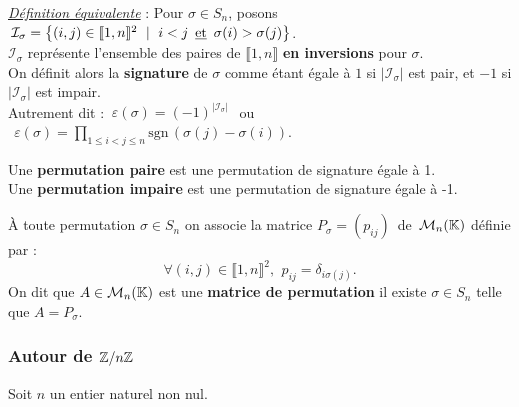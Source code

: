 \underline{\emph{Définition équivalente}} : Pour $\sigma\in S_n$, posons \(\,\mathcal{I}_\sigma = \bigl\{(i,j)\in \llbracket 1,n\rrbracket^2 \ \mid \ i<j \,\text{ \underline{et} }\, \sigma(i) > \sigma(j)\bigr\}\).\vspace{0.1cm}\\
\(\mathcal{I}_\sigma\) représente l'ensemble des paires de \(\llbracket 1,n\rrbracket\) \textbf{en inversions} pour $\sigma$.\vspace{0.1cm}\\
On définit alors la \textbf{signature} de $\sigma$ comme étant égale à $1$ si \(\lvert\mathcal{I}_\sigma\rvert\) est pair, et $-1$ si \(\lvert\mathcal{I}_\sigma\rvert\) est impair.\vspace{0.2cm}\\
Autrement dit : \(\ \displaystyle\varepsilon(\sigma)=(-1)^{\lvert\mathcal{I}_\sigma\rvert}\ \ \)  ou  \(\ \ \displaystyle \varepsilon(\sigma)=\!\!\!\prod_{1\leq i<j\leq n}\!\!\text{sgn}\,(\sigma(j)-\sigma(i))\).

\vspace{1.2cm}

\noindent Une \textbf{permutation paire} est une permutation de signature égale à 1.\\
Une \textbf{permutation impaire} est une permutation de signature égale à -1.

\vspace{1cm}

\noindent À toute permutation \(\sigma \in S_n\) on associe la matrice \(P_\sigma =(p_{ij})\,\) de \(\,\mathcal{M}_n(\mathbb{K})\) définie par :\vspace{-0.4cm}\\
\[\forall (i,j)\in \llbracket 1,n \rrbracket ^2,\ \, p_{ij}=\delta_{i\sigma(j)}.\]
\vspace{-0cm}
\noindent On dit que \(A\in \mathcal{M}_n(\mathbb{K})\) est une \textbf{matrice de permutation} \ssi il existe \(\sigma \in S_n\) telle que \(A=P_\sigma\).

\vspace{1.5cm}

\subsubsection{Autour de $\mathbb{Z}/n\mathbb{Z}$}
\vspace{0.5cm}
\begin{center}
    Soit $n$ un entier naturel non nul.
\end{center}


